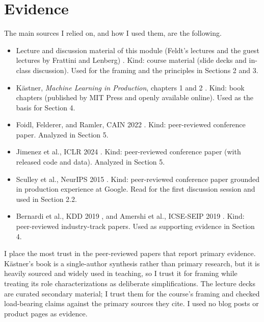\documentclass[11pt,a4paper]{article}
\begin{document}
\section{Evidence}

The main sources I relied on, and how I used them, are the following.

\begin{itemize}\itemsep2pt
  \item Lecture and discussion material of this module (Feldt's lectures and the guest lectures by Frattini and Lenberg) \cite{coursedecks}. Kind: course material (slide decks and in-class discussion). Used for the framing and the principles in Sections 2 and 3.
  \item K\"astner, \emph{Machine Learning in Production}, chapters 1 and 2 \cite{kastner}. Kind: book chapters (published by MIT Press and openly available online). Used as the basis for Section 4.
  \item Foidl, Felderer, and Ramler, CAIN 2022 \cite{foidl}. Kind: peer-reviewed conference paper. Analyzed in Section 5.
  \item Jimenez et al., ICLR 2024 \cite{jimenez}. Kind: peer-reviewed conference paper (with released code and data). Analyzed in Section 5.
  \item Sculley et al., NeurIPS 2015 \cite{sculley}. Kind: peer-reviewed conference paper grounded in production experience at Google. Read for the first discussion session and used in Section 2.2.
  \item Bernardi et al., KDD 2019 \cite{bernardi}, and Amershi et al., ICSE-SEIP 2019 \cite{amershi}. Kind: peer-reviewed industry-track papers. Used as supporting evidence in Section 4.
\end{itemize}

I place the most trust in the peer-reviewed papers that report primary evidence. K\"astner's book is a single-author synthesis rather than primary research, but it is heavily sourced and widely used in teaching, so I trust it for framing while treating its role characterizations as deliberate simplifications. The lecture decks are curated secondary material; I trust them for the course's framing and checked load-bearing claims against the primary sources they cite. I used no blog posts or product pages as evidence.


\end{document}
